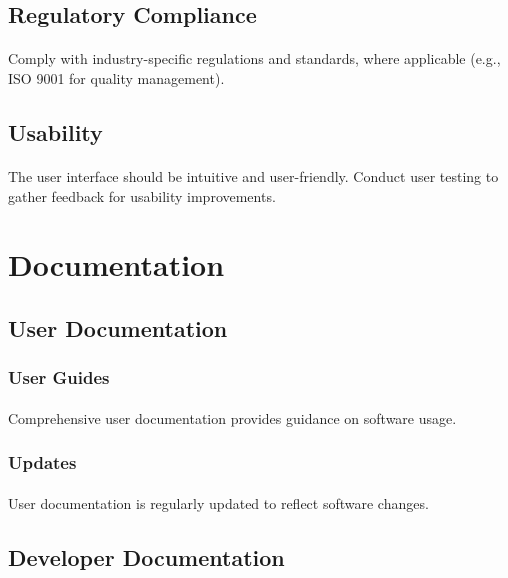 \documentclass{article}
\begin{document}
\subsection{Regulatory Compliance}
\paragraph{}
Comply with industry-specific regulations and standards, where applicable (e.g., ISO 9001 for quality management).

\subsection{Usability}
\paragraph{}
The user interface should be intuitive and user-friendly.
Conduct user testing to gather feedback for usability improvements.


\section{Documentation}
\subsection{User Documentation}
\subsubsection{User Guides}
\paragraph{}
Comprehensive user documentation provides guidance on software usage.

\subsubsection{Updates}
\paragraph{}
User documentation is regularly updated to reflect software changes.

\subsection{Developer Documentation}
\end{document}
